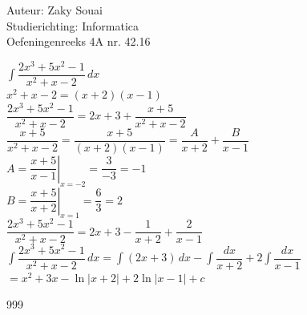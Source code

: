 \documentclass[a4paper]{article}
\begin{document}
  
\noindent \large Auteur: Zaky Souai \\
\noindent \large Studierichting:  Informatica\\
\noindent \large Oefeningenreeks 4A nr. 42.16\\

\bigskip

\normalsize

$\displaystyle \int \dfrac{2x^3+5x^2-1}{x^2+x-2}\,dx$\\

$\displaystyle x^2+x-2=(x+2)(x-1)$\\

$\displaystyle \dfrac{2x^3+5x^2-1}{x^2+x-2}=2x+3+\dfrac{x+5}{x^2+x-2}$\\

$\displaystyle \dfrac{x+5}{x^2+x-2}=\dfrac{x+5}{(x+2)(x-1)}=\dfrac{A}{x+2}+\dfrac{B}{x-1}$\\

$\displaystyle A=\left.\dfrac{x+5}{x-1}\right|_{x=-2}=\dfrac{3}{-3}=-1$\\

$\displaystyle B=\left.\dfrac{x+5}{x+2}\right|_{x=1}=\dfrac{6}{3}=2$\\

$\displaystyle \dfrac{2x^3+5x^2-1}{x^2+x-2}=2x+3-\dfrac{1}{x+2}+\dfrac{2}{x-1}$\\

$\displaystyle \int \dfrac{2x^3+5x^2-1}{x^2+x-2}\,dx=\int (2x+3)\,dx-\int\dfrac{dx}{x+2}+2\int\dfrac{dx}{x-1}$\\

$\displaystyle =x^2+3x-\ln|x+2|+2\ln|x-1|+c$


\begin{thebibliography}{999}
\end{thebibliography}
\end{document}
